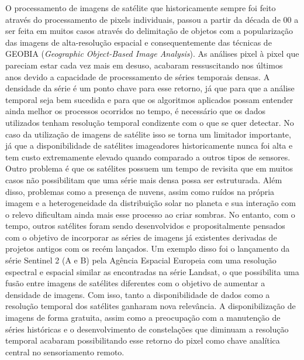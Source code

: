 O processamento de imagens de satélite que historicamente sempre foi feito através do processamento de pixels individuais, passou a partir da década de 00 a ser feita em muitos casos através do delimitação de objetos com a popularização das imagens de alta-resolução espacial e consequentemente das técnicas de GEOBIA (\textit{Geographic Object-Based Image Analysis}). As análises pixel à pixel que pareciam estar cada vez mais em desuso, acabaram ressuscitando nos últimos anos devido a capacidade de processamento de séries temporais densas. A densidade da série é um ponto chave para esse retorno, já que para que a análise temporal seja bem sucedida e para que os algoritmos aplicados possam entender ainda melhor os processos ocorridos no tempo, é necessário que os dados utilizados tenham resolução temporal condizente com o que se quer detectar. No caso da utilização de imagens de satélite isso se torna um limitador importante, já que a disponibilidade de satélites imageadores historicamente nunca foi alta e tem custo extremamente elevado quando comparado a outros tipos de sensores. Outro problema é que os satélites possuem um tempo de revisita que em muitos casos não possibilitam que uma série mais densa possa ser estruturada. 
Além disso, problemas como a presença de nuvens, assim como ruídos na própria imagem e a heterogeneidade da distribuição solar no planeta e sua interação com o relevo dificultam ainda mais esse processo ao criar sombras. No entanto, com o tempo, outros satélites foram sendo desenvolvidos e propositalmente pensados com o objetivo de incorporar as séries de imagens já existentes derivadas de projetos antigos com os recém lançados. Um exemplo disso foi o lançamento da série Sentinel 2 (A e B) pela Agência Espacial Europeia com uma resolução espectral e espacial similar as encontradas na série Landsat, o que possibilita uma fusão entre imagens de satélites diferentes com o objetivo de aumentar a densidade de imagens. Com isso, tanto a disponibilidade de dados como a resolução temporal dos satélites ganharam nova relevância. A disponibilização de imagens de forma gratuita, assim como a preocupação com a manutenção de séries históricas e o desenvolvimento de constelações que diminuam a resolução temporal acabaram possibilitando esse retorno do pixel como chave analítica central no sensoriamento remoto.


